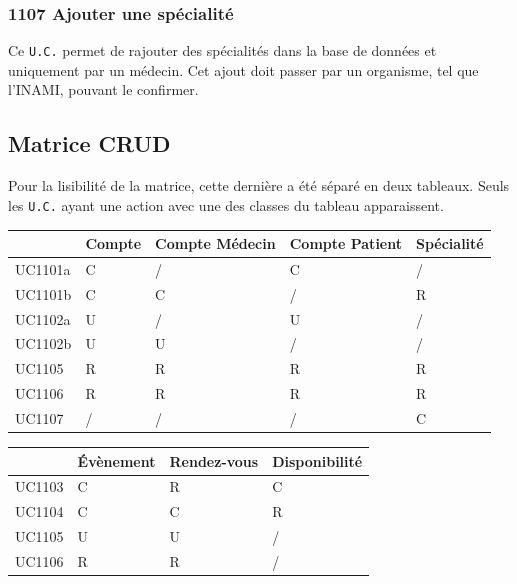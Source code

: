 \documentclass[a4paper, 11pt]{report}
\begin{document}
\subsubsection{\label{1107}1107 Ajouter une spécialité}
Ce \texttt{U.C.} permet de rajouter des spécialités dans la base de données et
uniquement par un médecin. Cet ajout doit passer par un organisme, tel que
l'INAMI, pouvant le confirmer.
\newpage
\subsection{Matrice CRUD}

Pour la lisibilité de la matrice, cette dernière a été séparé en deux tableaux.
Seuls les \texttt{U.C.} ayant une action avec une des classes du tableau apparaissent.

\begin{center}
	\begin{longtable}{|p{1.5cm}|p{1.5cm}|p{1.5cm}|p{1.5cm}|p{1.5cm}|}
		\hline
		& Compte & Compte Médecin & Compte Patient & Spécialité \\
		\hline
		UC1101a & C & / & C & / \\
		\hline
		UC1101b & C & C & / & R \\
		\hline
		UC1102a & U & / & U & / \\
		\hline
        UC1102b & U & U & / & / \\
        \hline
		UC1105  & R & R & R & R \\
		\hline
		UC1106 & R & R & R & R \\
		\hline
        UC1107 & / & / & / & C \\
        \hline

	\end{longtable}
\end{center}

\begin{center}
	\begin{longtable}{|p{2.2cm}|p{2.2cm}|p{2.2cm}|p{2.2cm}|}
		\hline
		& Évènement & Rendez-vous & Disponibilité  \\
		\hline
		UC1103 & C & R & C \\
		\hline 
		UC1104 & C & C & R \\
		\hline
		UC1105 & U & U & / \\
		\hline
		UC1106 & R & R & / \\
		\hline

	\end{longtable}
\end{center}
\end{document}
